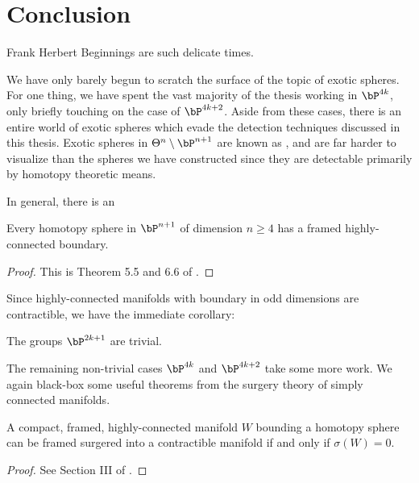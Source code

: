 \chapter{Conclusion}\label{chap:conclusion}

\begin{epigraph}{15em}{Frank Herbert}
	Beginnings are such delicate times.
\end{epigraph}

We have only barely begun to scratch the surface of the topic of exotic spheres. For one thing, we have spent the vast majority of the thesis working in $\bP^{4k}$, only briefly touching on the case of $\bP^{4k+2}$. Aside from these cases, there is an entire world of exotic spheres which evade the detection techniques discussed in this thesis. Exotic spheres in $\Theta^n\setminus \bP^{n+1}$ are known as , and are far harder to visualize than the spheres we have constructed since they are detectable primarily by homotopy theoretic means. 

In general, there is an

\begin{theorem}\label{thm:framed-surgery-highly-connected}
	Every homotopy sphere in $\bP^{n+1}$ of dimension $n\geq 4$ has a framed highly-connected boundary.
\end{theorem}
\begin{proof}
	This is Theorem 5.5 and 6.6 of \cite{milnorkervaire1963groups}. 
\end{proof}

Since highly-connected manifolds with boundary in odd dimensions are contractible, we have the immediate corollary:

\begin{corollary}\label{cor:odd-dimensional-bP-trivial}
	The groups $\bP^{2k+1}$ are trivial.
\end{corollary}

The remaining non-trivial cases $\bP^{4k}$ and $\bP^{4k+2}$ take some more work. We again black-box some useful theorems from the surgery theory of simply connected manifolds.

\begin{theorem}
	A compact, framed, highly-connected manifold $W$ bounding a homotopy sphere can be framed surgered into a contractible manifold if and only if $\sigma(W)=0$.
\end{theorem}
\begin{proof}
	See Section III of \cite{browder1972surgery}.
\end{proof}

